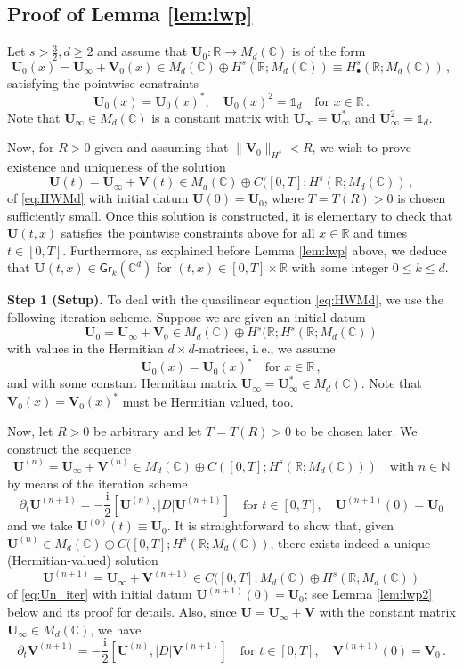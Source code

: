 \documentclass[11pt,reqno]{amsart}
\theoremstyle{definition}
\theoremstyle{remark}
\theoremstyle{remark}
\numberwithin{equation}{section}
\newcommand{\C}{\mathbb{C}}
\newcommand{\N}{\mathbb{N}}
\newcommand{\R}{\mathbb{R}}
\newcommand{\pt}{\partial}
\newcommand{\be}{\begin{equation}}
\newcommand{\ee}{\end{equation}}
\newcommand{\ii}{\mathrm{i}}
\newcommand{\Vb}{\mathbf{V}}
\newcommand{\Ub}{\mathbf{U}}
\newcommand{\Gr}{\mathsf{Gr}}
\begin{document}
\begin{appendix}
\subsection*{Proof of Lemma \ref{lem:lwp}} 
Let $s  > \frac{3}{2}, d \geq 2$ and assume that $\Ub_0 : \R \to M_d(\C)$ is of the form
$$
\Ub_0(x) = \Ub_\infty + \Vb_0(x) \in M_d(\C) \oplus H^s(\R; M_d(\C)) \equiv H^s_\bullet(\R; M_d(\C))  \, ,
$$
satisfying the pointwise constraints
$$
\Ub_0(x) = \Ub_0(x)^*, \quad \Ub_0(x)^2 = \mathds{1}_d \quad \mbox{for $x \in \R$} \, .
$$
Note that $\Ub_\infty \in M_d(\C)$ is a constant matrix with $\Ub_\infty=\Ub_\infty^*$ and $\Ub_\infty^2 = \mathds{1}_d$. 

Now, for $R> 0$ given and assuming that $\| \Vb_0 \|_{H^s} < R$, we wish to prove existence and uniqueness of the solution
$$
\Ub(t) = \Ub_\infty + \Vb(t) \in  M_d(\C) \oplus C([0,T]; H^s(\R; M_d(\C)) \, ,
$$
of \eqref{eq:HWMd} with initial datum $\Ub(0) = \Ub_0$, where $T=T(R) > 0$ is chosen sufficiently small. Once this solution is constructed, it is elementary to check that $\Ub(t,x)$ satisfies the pointwise constraints above for all $x \in \R$ and times $t \in [0,T]$. Furthermore, as explained before Lemma \ref{lem:lwp} above, we deduce that $\Ub(t,x) \in \Gr_k(\C^d)$ for $(t,x) \in [0,T] \times \R$ with some integer $0 \leq k \leq d$.

\medskip
\textbf{Step 1 (Setup).} To deal with the quasilinear equation \eqref{eq:HWMd}, we use the following iteration scheme. Suppose we are given an initial datum
\be \label{eq:lwp1}
\Ub_0 = \Ub_\infty + \Vb_0 \in M_d(\C) \oplus H^s(\R; H^s(\R; M_d(\C))
\ee
with values in the Hermitian $d \times d$-matrices, i.\,e., we assume
\be \label{eq:lwp2}
\Ub_0(x) = \Ub_0(x)^* \quad \mbox{for $x \in \R$} \, ,
\ee
and with some constant Hermitian matrix $\Ub_\infty = \Ub_\infty^* \in M_d(\C)$. Note that $\Vb_0(x)=\Vb_0(x)^*$ must be Hermitian valued, too.

Now, let $R> 0$ be arbitrary and let $T=T(R) > 0$ to be chosen later. We construct the sequence
$$
\Ub^{(n)}= \Ub_\infty + \Vb^{(n)} \in  M_d(\C) \oplus C([0,T]; H^s(\R; M_d(\C))) \quad \mbox{with $n \in \N$}
$$
by means of the iteration scheme
\be \label{eq:Un_iter}
\pt_t \Ub^{(n+1)} = -\frac{\ii}{2} [\Ub^{(n)}, |D| \Ub^{(n+1)}] \quad \mbox{for $t \in [0,T]$}, \quad \Ub^{(n+1)}(0) = \Ub_0 
\ee
and we take $\Ub^{(0)}(t) \equiv \Ub_0$. It is straightforward to show that, given $\Ub^{(n)} \in M_d(\C) \oplus C([0,T]; H^s(\R; M_d(\C))$, there exists indeed a unique (Hermitian-valued) solution 
$$
\Ub^{(n+1)} = \Ub_\infty + \Vb^{(n+1)} \in C([0,T]; M_d(\C) \oplus H^s(\R; M_d(\C)) 
$$
of \eqref{eq:Un_iter} with initial datum $\Ub^{(n+1)}(0) = \Ub_0$; see Lemma \ref{lem:lwp2} below and its proof for details. Also, since $\Ub = \Ub_\infty + \Vb$ with the constant matrix $\Ub_\infty \in M_d(\C)$, we have
$$
\pt_t \Vb^{(n+1)} = -\frac{\ii}{2} [\Ub^{(n)}, |D| \Vb^{(n+1)}] \quad \mbox{for $t \in [0,T]$}, \quad \Vb^{(n+1)}(0) = \Vb_0 \, .
$$




\end{appendix}
\end{document}

